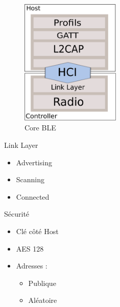 \begin{frame}

\begin{minipage}[t]{0.47\linewidth}
	\begin{figure}
		\includegraphics[height=6cm]{img/arch_core_ble.png}
		\caption{Core BLE}
	\end{figure}
\end{minipage}
\begin{minipage}[t]{0.45\linewidth}
	\begin{block}{Link Layer}
		\begin{itemize}
			\item Advertising
			\item Scanning
			\item Connected
		\end{itemize}
	\end{block}
	\begin{block}{Sécurité}
		\begin{itemize}
			\item Clé côté Host
			\item AES 128
			\item Adresses :
			\begin{itemize}
				\item Publique
				\item Aléatoire
			\end{itemize}
		\end{itemize}
	\end{block}
\end{minipage}
\end{frame}

